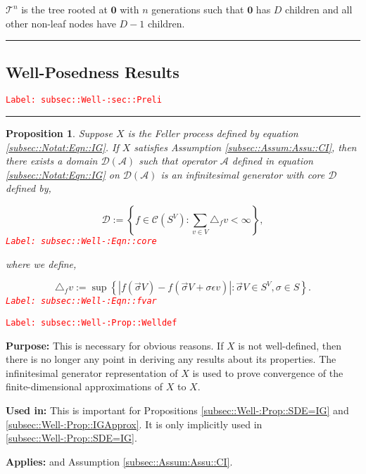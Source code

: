\documentclass[12pt]{article}
\newcommand{\mc}{\mathcal}
\newcommand{\ep}{\epsilon}
\newcommand{\tr}{\textcolor{red}}
\newcommand{\labe}[1]{\tr{\texttt{Label: #1}}}
\newcommand{\purpose}{\textbf{Purpose: }}
\newcommand{\usein}{\textbf{Used in: }}
\newcommand{\app}{\textbf{Applies: }}
\newcommand{\ind}{\hspace{24pt}}
\newcommand{\lin}{\rule{\linewidth}{0.4 pt}}
\newcommand{\defeq}{:=}								%
\renewcommand{\root}{\mathbf{0}}				%
\renewcommand{\v}{v}							%
\renewcommand{\S}{S}							%
\newcommand{\s}{\sigma}							%
\newcommand{\sv}{\vec{\s}}						%
\newcommand{\ev}{\ep}							%
\newcommand{\X}{X}								%
\newcommand{\IG}{\mc{A}}						%
\newcommand{\f}{f}								%
\newcommand{\degr}{D}							%
\newcommand{\tree}{\mc{T}}						%
\newcommand{\core}{\mc{D}}						%
\newcommand{\cont}{\mc{C}}						%
\newcommand{\delt}{\triangle}					%
\newcommand{\deltf}[1]{_{#1}}					%
\newtheorem{prop}[thms]{Proposition}
\begin{document}
\ind \(\tree^n\) is the tree rooted at \(\root\) with \(n\) generations such that \(\root\) has \(\degr\) children and all other non-leaf nodes have \(\degr-1\) children.

\lin

\subsection{Well-Posedness Results}
\label{subsec::Well-:sec::Preli}\labe{subsec::Well-:sec::Preli}

\rule{\linewidth}{0.4 pt}

\begin{prop}
Suppose \(\X{}{}\) is the Feller process defined by equation \eqref{subsec::Notat:Eqn::IG}. If \(\X{}{}\) satisfies Assumption \ref{subsec::Assum:Assu::CI}, then there exists a domain \(\core(\IG)\) such that operator \(\IG\) defined in equation \eqref{subsec::Notat:Eqn::IG} on \(\mc{D}(\IG)\) is an infinitesimal generator with core \(\core\) defined by,

\begin{equation}
\core \defeq \left\{f \in \cont(\S^ V): \sum_{\v\in V} \delt\deltf{\f}{\v} < \infty\right\},
\label{subsec::Well-:Eqn::core}
\end{equation}
\labe{subsec::Well-:Eqn::core}

where we define,

\begin{equation}
\delt\deltf{\f}{\v} \defeq \sup\left\{|f(\sv{}{ V}) - f(\sv{}{ V}+\s\ev{\v})|: \sv{}{ V} \in \S^ V,\s \in \S\right\}.
\label{subsec::Well-:Eqn::fvar}
\end{equation}
\labe{subsec::Well-:Eqn::fvar}

\label{subsec::Well-:Prop::Welldef}
\end{prop}
\labe{subsec::Well-:Prop::Welldef}

\purpose This is necessary for obvious reasons. If \(\X{}{}\) is not well-defined, then there is no longer any point in deriving any results about its properties. The infinitesimal generator representation of \(\X{}{}\) is used to prove convergence of the finite-dimensional approximations of \(\X{}{}\) to \(\X{}{}\).

\usein This is important for Propositions \ref{subsec::Well-:Prop::SDE=IG} and \ref{subsec::Well-:Prop::IGApprox}. It is only implicitly used in \ref{subsec::Well-:Prop::SDE=IG}.

\app \cite[Theorem 3.9]{Lig85} and Assumption \ref{subsec::Assum:Assu::CI}.
\end{document}

